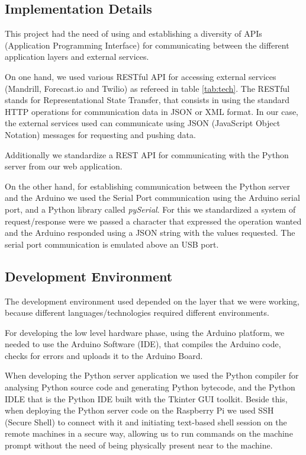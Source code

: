 \documentclass[12pt]{report}
\begin{document}
\subsection{Implementation Details}

This project had the need of using and establishing a diversity of APIs (Application Programming Interface) for communicating between the different application layers and external services.

On one hand, we used various RESTful API for accessing external services (Mandrill\cite{mandrillapi}, Forecast.io\cite{fcapi} and Twilio\cite{twilioapi}) as refereed in table \ref{tab:tech}. The RESTful stands for Representational State Transfer, that consists in using the standard HTTP operations for communication data in JSON or XML format. In our case, the external services used can communicate using JSON (JavaScript Object Notation) messages for requesting and pushing data.

Additionally we standardize a REST API for communicating with the Python server from our web application.

On the other hand, for establishing communication between the Python server and the Arduino we used the Serial Port communication using the Arduino serial port\cite{serial}, and a Python library called \textit{pySerial}\cite{pyserial}. For this we standardized a system of request/response were we passed a character that expressed the operation wanted and the Arduino responded using a JSON string with the values requested. The serial port communication is emulated above an USB port.



\subsection{Development Environment}

The development environment used depended on the layer that we were working, because different languages/technologies required different environments.

For developing the low level hardware phase, using the Arduino platform, we needed to use the Arduino Software (IDE)\cite{arduinoide}, that compiles the Arduino code, checks for errors and uploads it to the Arduino Board.

When developing the Python server application we used the Python compiler for analysing Python source code and generating Python bytecode, and the Python IDLE that is the Python IDE built with the Tkinter GUI toolkit. Beside this, when deploying the Python server code on the Raspberry Pi we used  SSH (Secure Shell) to connect with it and initiating text-based shell session on the remote machines in a secure way, allowing us to run commands on the machine prompt without the need of being physically present near to the machine.
\end{document}

